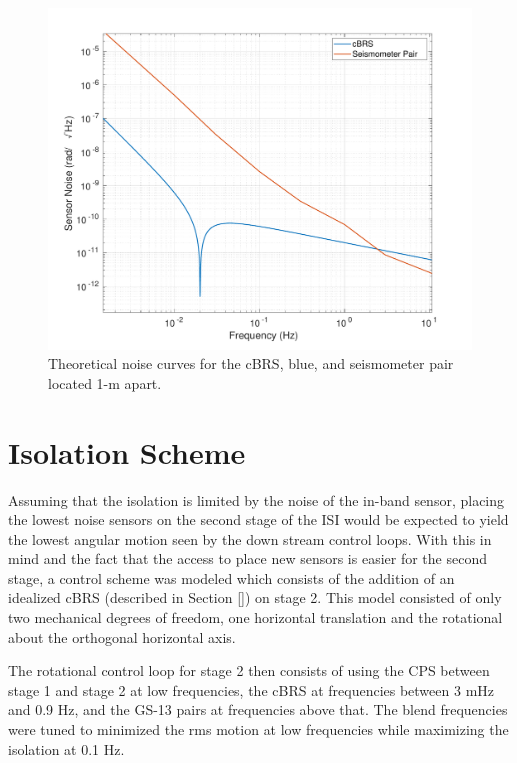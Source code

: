 \documentclass [12pt, proquest]{uwthesis}[2019]
\begin{document}
\begin{figure}%
\begin{center}
\includegraphics[width=\textwidth]{SensorNoise.pdf}
\caption{Theoretical noise curves for the cBRS, blue, and seismometer pair located 1-m apart.}
\label{sensNoise}
\end{center}
\end{figure}

\section{Isolation Scheme} \label{IsoScheme}

Assuming that the isolation is limited by the noise of the in-band sensor, placing the lowest noise sensors on the second stage of the ISI would be expected to yield the lowest angular motion seen by the down stream control loops. With this in mind and the fact that the access to place new sensors is easier for the second stage, a control scheme was modeled which consists of the addition of an idealized cBRS (described in Section \ref{}) on stage 2. This model consisted of only two mechanical degrees of freedom, one horizontal translation and the rotational about the orthogonal horizontal axis.

The rotational control loop for stage 2 then consists of using the CPS between stage 1 and stage 2 at low frequencies, the cBRS at frequencies between 3 mHz and 0.9 Hz, and the GS-13 pairs at frequencies above that. The blend frequencies were tuned to minimized the rms motion at low frequencies while maximizing the isolation at 0.1 Hz. 
\end{document}
